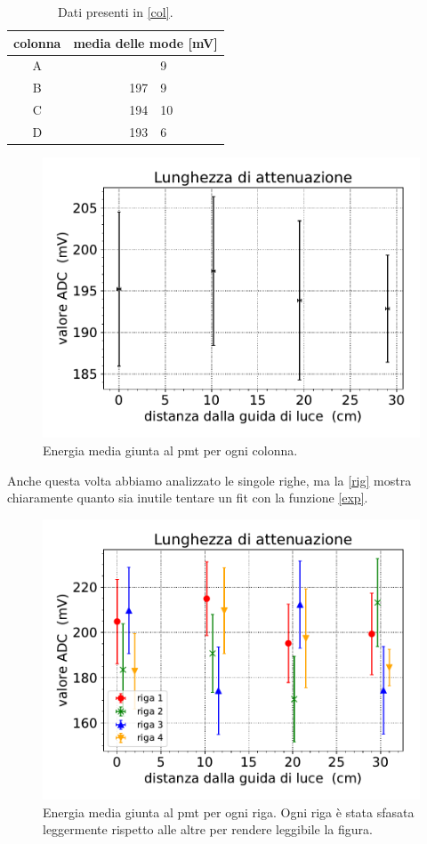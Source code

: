 \begin{table}[h]
\centering
\begin{tabular}{| c | r @{$\,\pm\,$} l |}
\hline
colonna & \multicolumn{2}{c|}{media delle mode [mV]} \\
\hline
A & \qquad \quad 195&9 \\
B & 197&9 \\
C & 194&10 \\
D & 193&6 \\
\hline
\end{tabular}
\caption{Dati presenti in \autoref{col}.}
\label{tab:ADC}
\end {table}

\begin{figure}[h]
\centering
\includegraphics[width=8 cm]{ecol}
\caption{Energia media giunta al pmt per ogni colonna.}
\label{col}
\end{figure}


Anche questa volta abbiamo analizzato le singole righe, ma la \autoref{rig} mostra chiaramente quanto sia inutile tentare un fit con la funzione \eqref{exp}. 

\begin{figure}[h]
\centering
\includegraphics[width=8 cm]{erig}
\caption{Energia media giunta al pmt per ogni riga.
Ogni riga è stata sfasata leggermente rispetto alle altre per rendere leggibile la figura.}
\label{rig}
\end{figure}


